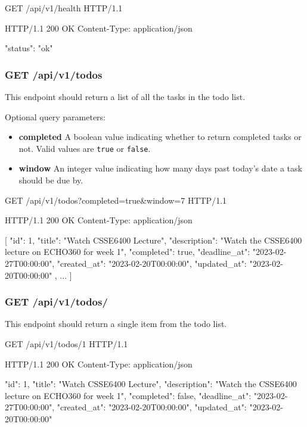 \documentclass{csse4400}
\begin{document}
\begin{code}[language=json,numbers=none]{}
GET /api/v1/health HTTP/1.1
\end{code}
\begin{code}[language=json,numbers=none]{}
HTTP/1.1 200 OK
Content-Type: application/json

{
  "status": "ok"
}
\end{code}

\subsubsection{GET /api/v1/todos}
This endpoint should return a list of all the tasks in the todo list.

Optional query parameters:
\begin{itemize}
\item \textbf{completed} A boolean value indicating whether to return completed tasks or not. Valid values are \texttt{true} or \texttt{false}.
  \item\textbf{window} An integer value indicating how many days past today's date a task should be due by.
\end{itemize}

\begin{code}[language=json,numbers=none]{}
GET /api/v1/todos?completed=true&window=7 HTTP/1.1
\end{code}
\begin{code}[language=json,numbers=none]{}
HTTP/1.1 200 OK
Content-Type: application/json

[
    {
      "id": 1,
      "title": "Watch CSSE6400 Lecture",
      "description": "Watch the CSSE6400 lecture on ECHO360 for week 1",
      "completed": true,
      "deadline_at": "2023-02-27T00:00:00",
      "created_at": "2023-02-20T00:00:00",
      "updated_at": "2023-02-20T00:00:00"
    },
    ...
]
\end{code}

\subsubsection{GET /api/v1/todos/}
This endpoint should return a single item from the todo list.

\begin{code}[language=json,numbers=none]{}
GET /api/v1/todos/1 HTTP/1.1
\end{code}
\begin{code}[language=json,numbers=none]{}
HTTP/1.1 200 OK
Content-Type: application/json

{
    "id": 1,
    "title": "Watch CSSE6400 Lecture",
    "description": "Watch the CSSE6400 lecture on ECHO360 for week 1",
    "completed": false,
    "deadline_at": "2023-02-27T00:00:00",
    "created_at": "2023-02-20T00:00:00",
    "updated_at": "2023-02-20T00:00:00"
}
\end{code}
\end{document}
